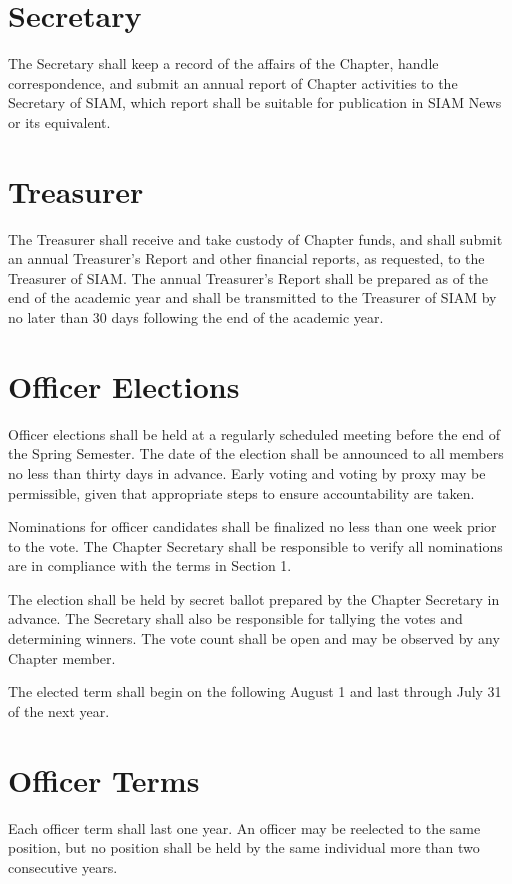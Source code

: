 \documentclass{ronr-bylaws}
\begin{document}
\section{Secretary}
The Secretary shall keep a record of the affairs of the Chapter, handle correspondence, and submit an annual report of Chapter activities to the Secretary of SIAM, which report shall be suitable for publication in SIAM News or its equivalent.

\section{Treasurer}
The Treasurer shall receive and take custody of Chapter funds, and shall submit an annual Treasurer's Report and other financial reports, as requested, to the Treasurer of SIAM.  The annual Treasurer's Report shall be prepared as of the end of the academic year and shall be transmitted to the Treasurer of SIAM by no later than 30 days following the end of the academic year.

\section{Officer Elections}
Officer elections shall be held at a regularly scheduled meeting before the end of the
Spring Semester. The date of the election shall be announced to all members no less than thirty
days in advance. Early voting and voting by proxy may be permissible, given that appropriate
steps to ensure accountability are taken.

Nominations for officer candidates shall be finalized no less than one week prior to the vote. The
Chapter Secretary shall be responsible to verify all nominations are in compliance with the terms
in Section 1.

The election shall be held by secret ballot prepared by the Chapter Secretary in advance. The
Secretary shall also be responsible for tallying the votes and determining winners. The vote count
shall be open and may be observed by any Chapter member.

The elected term shall begin on the following August 1 and last through July 31 of the next year.

\section{Officer Terms}
Each officer term shall last one year. An officer may be reelected to the same position,
but no position shall be held by the same individual more than two consecutive years.
\end{document}
